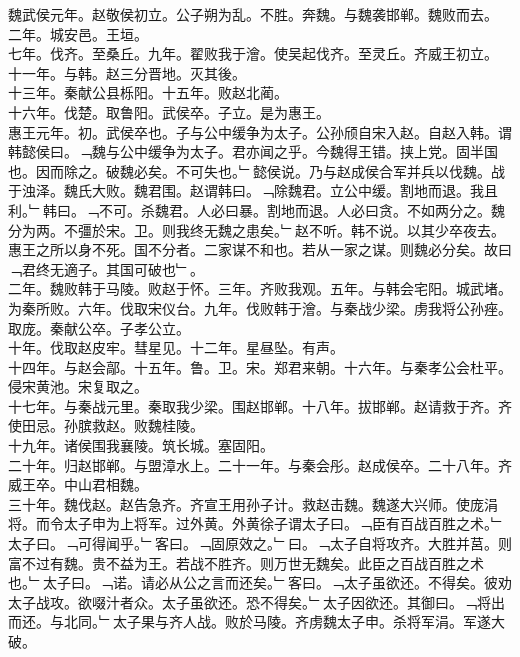 \documentclass{zhvt-classic}
\begin{document}
\hspace*{2em}魏武侯元年。赵敬侯初立。公子朔为乱。不胜。奔魏。与魏袭邯郸。魏败而去。\\
\hspace*{2em}二年。城安邑。王垣。\\
\hspace*{2em}七年。伐齐。至桑丘。九年。翟败我于澮。使吴起伐齐。至灵丘。齐威王初立。\\
\hspace*{2em}十一年。与韩。赵三分晋地。灭其後。\\
\hspace*{2em}十三年。秦献公县栎阳。十五年。败赵北蔺。\\
\hspace*{2em}十六年。伐楚。取鲁阳。武侯卒。子立。是为惠王。\\
\hspace*{2em}惠王元年。初。武侯卒也。子与公中缓争为太子。公孙颀自宋入赵。自赵入韩。谓韩懿侯曰。﹁魏与公中缓争为太子。君亦闻之乎。今魏得王错。挟上党。固半国也。因而除之。破魏必矣。不可失也。﹂懿侯说。乃与赵成侯合军并兵以伐魏。战于浊泽。魏氏大败。魏君围。赵谓韩曰。﹁除魏君。立公中缓。割地而退。我且利。﹂韩曰。﹁不可。杀魏君。人必曰暴。割地而退。人必曰贪。不如两分之。魏分为两。不彊於宋。卫。则我终无魏之患矣。﹂赵不听。韩不说。以其少卒夜去。惠王之所以身不死。国不分者。二家谋不和也。若从一家之谋。则魏必分矣。故曰﹁君终无適子。其国可破也﹂。\\
\hspace*{2em}二年。魏败韩于马陵。败赵于怀。三年。齐败我观。五年。与韩会宅阳。城武堵。为秦所败。六年。伐取宋仪台。九年。伐败韩于澮。与秦战少梁。虏我将公孙痤。取庞。秦献公卒。子孝公立。\\
\hspace*{2em}十年。伐取赵皮牢。彗星见。十二年。星昼坠。有声。\\
\hspace*{2em}十四年。与赵会鄗。十五年。鲁。卫。宋。郑君来朝。十六年。与秦孝公会杜平。侵宋黄池。宋复取之。\\
\hspace*{2em}十七年。与秦战元里。秦取我少梁。围赵邯郸。十八年。拔邯郸。赵请救于齐。齐使田忌。孙膑救赵。败魏桂陵。\\
\hspace*{2em}十九年。诸侯围我襄陵。筑长城。塞固阳。\\
\hspace*{2em}二十年。归赵邯郸。与盟漳水上。二十一年。与秦会彤。赵成侯卒。二十八年。齐威王卒。中山君相魏。\\
\hspace*{2em}三十年。魏伐赵。赵告急齐。齐宣王用孙子计。救赵击魏。魏遂大兴师。使庞涓将。而令太子申为上将军。过外黄。外黄徐子谓太子曰。﹁臣有百战百胜之术。﹂太子曰。﹁可得闻乎。﹂客曰。﹁固原效之。﹂曰。﹁太子自将攻齐。大胜并莒。则富不过有魏。贵不益为王。若战不胜齐。则万世无魏矣。此臣之百战百胜之术也。﹂太子曰。﹁诺。请必从公之言而还矣。﹂客曰。﹁太子虽欲还。不得矣。彼劝太子战攻。欲啜汁者众。太子虽欲还。恐不得矣。﹂太子因欲还。其御曰。﹁将出而还。与北同。﹂太子果与齐人战。败於马陵。齐虏魏太子申。杀将军涓。军遂大破。\\
\end{document}
